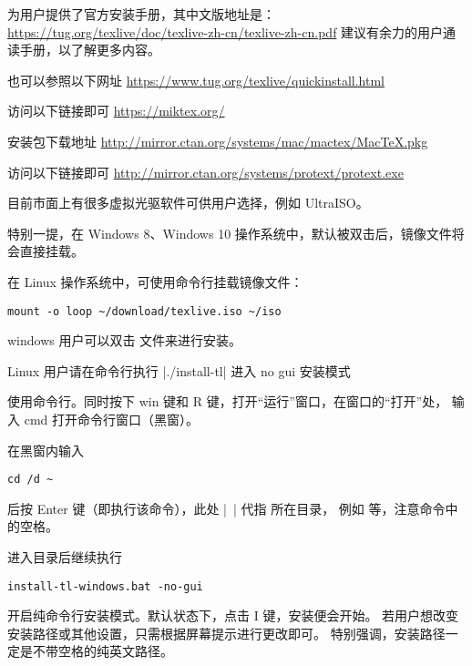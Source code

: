 \TeXLive{} 为用户提供了官方安装手册，其中文版地址是：
\url{https://tug.org/texlive/doc/texlive-zh-cn/texlive-zh-cn.pdf}
建议有余力的用户通读手册，以了解更多内容。

也可以参照以下网址 \url{https://www.tug.org/texlive/quickinstall.html}


访问以下链接即可 \url{https://miktex.org/}


\MacTeX{} 安装包下载地址 \url{http://mirror.ctan.org/systems/mac/mactex/MacTeX.pkg}



访问以下链接即可 \url{http://mirror.ctan.org/systems/protext/protext.exe}



目前市面上有很多虚拟光驱软件可供用户选择，例如 UltraISO。

特别一提，在 Windows 8、Windows 10
操作系统中，默认被双击后，镜像文件将会直接挂载。

在 Linux 操作系统中，可使用命令行挂载镜像文件：
\begin{verbatim}
mount -o loop ~/download/texlive.iso ~/iso
\end{verbatim}



windows 用户可以双击  文件来进行安装。

Linux 用户请在命令行执行 |./install-tl| 进入 no gui 安装模式



使用命令行。同时按下 win 键和 R 键，打开“运行”窗口，在窗口的“打开”处，
输入 cmd 打开命令行窗口（黑窗）。

在黑窗内输入
\begin{verbatim}
cd /d ~
\end{verbatim}
后按 Enter 键（即执行该命令），此处 |~| 代指  
所在目录，
例如  等，注意命令中的空格。

进入目录后继续执行
\begin{verbatim}
install-tl-windows.bat -no-gui
\end{verbatim}
开启纯命令行安装模式。默认状态下，点击 I 键，安装便会开始。
若用户想改变安装路径或其他设置，只需根据屏幕提示进行更改即可。
特别强调，安装路径一定是不带空格的纯英文路径。


